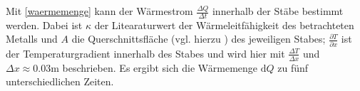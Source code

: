Mit \eqref{waermemenge} kann der Wärmestrom $\frac{\Delta{Q}}{\Delta{t}}$ innerhalb der Stäbe bestimmt werden. 
Dabei ist $\kappa$ der Litearaturwert der Wärmeleitfähigkeit des betrachteten Metalls und $A$ die Querschnittsfläche (vgl. hierzu \cite{V204}) des jeweiligen Stabes; $\frac{\partial T}{\partial x}$ ist der Temperaturgradient innerhalb des Stabes und wird hier mit $\frac{\Delta T}{\Delta x}$ und $\Delta x \approx 0.03\si{\meter}$ beschrieben.
Es ergibt sich die Wärmemenge $\mathup{d}Q$ zu fünf unterschiedlichen Zeiten.
%
